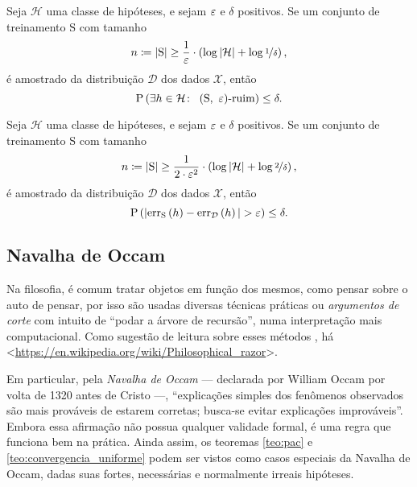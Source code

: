 \begin{teorema}
  \label{teo:pac}
  Seja $\mathcal{H}$ uma classe de hipóteses, e sejam $\varepsilon$ e $\delta$ positivos. Se um conjunto de treinamento $\mathrm{S}$ com tamanho
  \[
    n \coloneqq \left|\mathrm{S}\vphantom{1j}\right| \geq \frac{1}{\varepsilon}\cdot\left(\log\left|\mathcal{H}\vphantom{1j}\right| + \log\nicefrac{1}{\delta}\vphantom{1j}\right),
  \]
  é amostrado da distribuição $\mathcal{D}$ dos dados $\mathcal{X}$, então
  \[
    \mathrm{P}\left(\exists h\in\mathcal{H}\colon\ \left(\mathrm{S},\ \eps\vphantom{1j}\right)\!\text{-ruim}\vphantom{1j}\right) \leq \delta.
  \]
\end{teorema}

\begin{teorema}
  \label{teo:convergencia_uniforme}
  Seja $\mathcal{H}$ uma classe de hipóteses, e sejam $\varepsilon$ e $\delta$ positivos. Se um conjunto de treinamento $\mathrm{S}$ com tamanho
  \[
    n \coloneqq \left|\mathrm{S}\vphantom{1j}\right| \geq \frac{1}{2\cdot\varepsilon^2}\cdot\left(\log\left|\mathcal{H}\vphantom{1j}\right| + \log\nicefrac{2}{\delta}\vphantom{1j}\right),
  \]
  é amostrado da distribuição $\mathcal{D}$ dos dados $\mathcal{X}$, então
  \[
    \mathrm{P}\left(\left|\mathrm{err}_\mathrm{S}\left(h\vphantom{1j}\right)-\mathrm{err}_\mathcal{D}\left(h\vphantom{1j}\right)\vphantom{1j}\right| > \varepsilon\vphantom{1j}\right) \leq \delta.
  \]
\end{teorema}

\subsection{Navalha de Occam}

Na filosofia, é comum tratar objetos em função dos mesmos, como pensar sobre o auto de pensar, por isso são usadas diversas técnicas práticas ou \textit{argumentos de corte} com intuito de ``podar a árvore de recursão'', numa interpretação mais computacional. Como sugestão de leitura sobre esses métodos , há <\href{https://en.wikipedia.org/wiki/Philosophical\_razor}{https://en.wikipedia.org/wiki/Philosophical\_razor}>.

Em particular, pela \textit{Navalha de Occam} --- declarada por William Occam por volta de 1320 antes de Cristo ---, ``explicações simples dos fenômenos observados são mais prováveis de estarem corretas; busca-se evitar explicações improváveis''. Embora essa afirmação não possua qualquer validade formal, é uma regra que funciona bem na prática. Ainda assim, os teoremas \autoref{teo:pac} e \autoref{teo:convergencia_uniforme} podem ser vistos como casos especiais da Navalha de Occam, dadas suas fortes, necessárias e normalmente irreais hipóteses.

